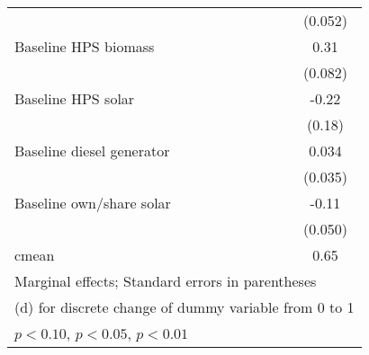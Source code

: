 \begin{table}[htbp]
\begin{tabular*}{1\hsize}{@{\hskip\tabcolsep\extracolsep\fill}l*{5}{c}}
                &                  &                  &                  &                  &  (0.052)         \\
Baseline HPS biomass&                  &                  &                  &                  &     0.31\sym{***}\\
                &                  &                  &                  &                  &  (0.082)         \\
Baseline HPS solar&                  &                  &                  &                  &    -0.22         \\
                &                  &                  &                  &                  &   (0.18)         \\
Baseline diesel generator&                  &                  &                  &                  &    0.034         \\
                &                  &                  &                  &                  &  (0.035)         \\
Baseline own/share solar&                  &                  &                  &                  &    -0.11\sym{**} \\
                &                  &                  &                  &                  &  (0.050)         \\
\midrule
cmean           &                  &                  &                  &                  &     0.65         \\
\bottomrule
\multicolumn{6}{l}{\footnotesize Marginal effects; Standard errors in parentheses}\\
\multicolumn{6}{l}{\footnotesize  (d) for discrete change of dummy variable from 0 to 1}\\
\multicolumn{6}{l}{\footnotesize \sym{*} \(p<0.10\), \sym{**} \(p<0.05\), \sym{***} \(p<0.01\)}\\
\end{tabular*}
\end{table}
